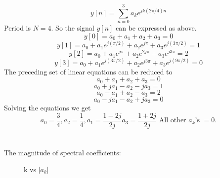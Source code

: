 \documentclass[10pt,a4paper, margin=1in]{article}
\begin{document}
\begin{enumerate}
\begin{enumerate}
    \[ y[n] = \sum_{n=0}^{3} a_k e^{jk(2\pi/4) n} \] 
    Period is $N=4$. So the signal $y[n]$ can be expressed as above.
    \[ y[0] = a_0 + a_1 + a_2 + a_3 = 0\]
    \[ y[1] = a_0 + a_1 e^{j(\pi/2)} + a_2 e^{j\pi} + a_3 e^{j(3\pi/2)} = 1\]
    \[ y[2] = a_0 + a_1 e^{j\pi} + a_2 e^{2j\pi} + a_3 e^{j3\pi} = 2\]
    \[ y[3] = a_0 + a_1 e^{j(3\pi/2)} + a_2 e^{j3\pi} + a_3 e^{j(9\pi/2)} = 0\]
    The preceding set of linear equations can be reduced to
    \[a_0 + a_1 + a_2 + a_3 = 0\]
    \[a_0 + ja_1 - a_2 - ja_3 = 1\]
    \[a_0 - a_1 + a_2 - a_3 = 2\]
    \[a_0 - ja_1 - a_2 + ja_3 = 0\]
    Solving the equations we get
    \[ a_0 = \frac{3}{4}, a_2 = \frac{1}{4}, a_1 = \frac{1-2j}{2j} a_3 = \frac{1+2j}{2j} \text{ All other } a_k \text{'s } = 0. \]
    \\\\The magnitude of spectral coefficients:
    \begin{figure} [H]
        \centering
        \caption{k vs $|a_k|$}
        \label{fig:q6b_1.dat}
    \end{figure}
    

\end{enumerate}
\end{enumerate}
\end{document}
